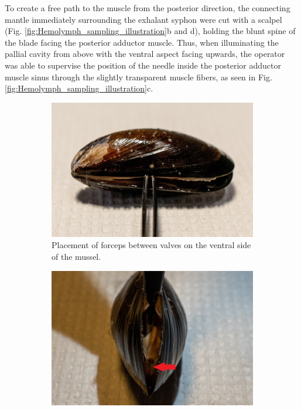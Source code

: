 To create a free path to the muscle from the posterior direction, the connecting mantle immediately surrounding the exhalant syphon were cut with a scalpel (Fig. \ref{fig:Hemolymph_sampling_illustration}b and d), holding the blunt spine of the blade facing the posterior adductor muscle. Thus, when illuminating the pallial cavity from above with the ventral aspect facing upwards, the operator was able to supervise the position of the needle inside the posterior adductor muscle sinus through the slightly transparent muscle fibers, as seen in Fig. \ref{fig:Hemolymph_sampling_illustration}c.

\begin{figure}[H]
    \centering
    \begin{subfigure}[b]{.45\textwidth}
        \centering
        \includegraphics[width=\textwidth]{figures/Sampling technique/forceps square color.jpg}
        \caption{Placement of forceps between valves on the ventral side of the mussel.}
        \label{sfig:a}
    \end{subfigure}
    \hfill
    \begin{subfigure}[b]{.45\textwidth}
        \centering
        \includegraphics[width=\textwidth]{figures/Sampling technique/uncut color 3495.jpg}

\end{subfigure}
\end{figure}
